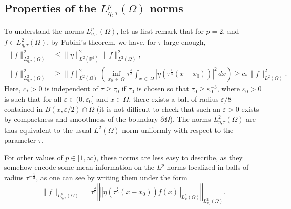 \documentclass[10pt]{amsart}
\theoremstyle{definition}\newtheorem{defi}[theo]{Definition}\newtheorem{rema}[theo]{Remark}\newtheorem{exam}[theo]{Example}\newtheorem{exem}[theo]{Example}\newtheorem{nota}[theo]{Notation}
\newcommand*\R{\mathbb{R}}
\newcommand{\norm}[1]{\left\Vert#1\right\Vert}
\renewcommand{\leq}{\leqslant}
\renewcommand{\geq}{\geqslant}
\begin{document}

\subsection*{Properties of the $L^p_{\eta, \tau}(\Omega)$ norms}


To understand the norms $L^{p}_{\eta,\tau}(\Omega)$, let us first remark that for $p = 2$, and $f \in L^2_{\eta, \tau} (\Omega)$, by Fubini's theorem, we have, for $\tau$ large enough,
\begin{align*}
\| f \|_{L^2_{\eta, \tau}(\Omega)}^2 &\leq \|\eta\|_{L^2(\R^d)}^2 \| f\|_{L^2(\Omega)}^2,
\\
 \| f \|_{L^2_{\eta, \tau}(\Omega)}^2
&\geq \| f \|_{L^2(\Omega)}^2
\left(
\inf_{x_0\,\in\,\Omega} \tau^{\frac{d}{3}} \int_{x\,\in \,\Omega} \left|\eta\left(\tau^{\frac{1}{3}} (x -x_0)\right)\right|^2 \, dx
\right)
\geq c_* \| f\|_{L^2(\Omega)}^2.
\end{align*}
Here, $c_*>0$ is independent of $\tau \geq \tau_0$ if $\tau_0$ is chosen so that $\tau_0 \geq \varepsilon_0^{-3}$, where $\varepsilon_0 >0$ is such that for all $\varepsilon \in (0, \varepsilon_0]$ and $x \in \Omega$, there exists a ball of radius $\varepsilon/8$ contained in $B(x, \varepsilon/2) \cap \Omega$ (it is not difficult to check that such an $\varepsilon>0$ exists by compactness and smoothness of the boundary $\partial \Omega$). The norms $L^2_{\eta, \tau}(\Omega)$ are thus equivalent to the usual $L^2(\Omega)$ norm uniformly with respect to the parameter $\tau$.


For other values of $p \in [1, \infty)$, these norms are less easy to describe, as they somehow encode some mean information on the $L^p$-norms localized in balls of radius $\tau^{-\frac{1}{3}}$, as one can see by writing them under the form
\pagebreak
\[
\| f \|_{L^{p}_{\eta,\tau}(\Omega)} = \tau^{\frac{d}{6}} \norm{\norm{ \eta\left(\tau^{\frac{1}{3}} (x - x_0)\right) f(x) }_{L^p_x(\Omega)}}_{L^2_{x_0} (\Omega)}.
\]
\end{document}
